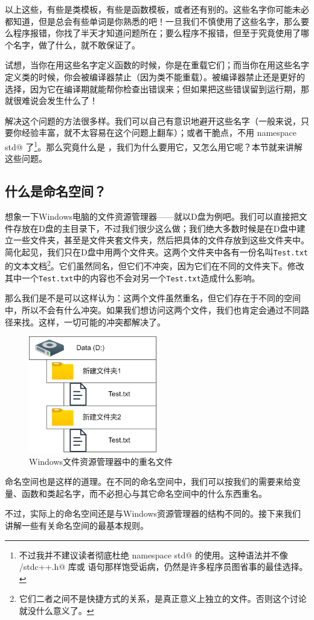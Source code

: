以上这些，有些是类模板，有些是函数模板，或者还有别的。这些名字你可能未必都知道，但是总会有些单词是你熟悉的吧！一旦我们不慎使用了这些名字，那么要么程序报错，你找了半天才知道问题所在；要么程序不报错，但至于究竟使用了哪个名字，做了什么，就不敢保证了。\par
试想，当你在用这些名字定义函数的时候，你是在重载它们；而当你在用这些名字定义类的时候，你会被编译器禁止（因为类不能重载）。被编译器禁止还是更好的选择，因为它在编译期就能帮你检查出错误来；但如果把这些错误留到运行期，那就很难说会发生什么了！\par
解决这个问题的方法很多样。我们可以自己有意识地避开这些名字（一般来说，只要你经验丰富，就不太容易在这个问题上翻车）；或者干脆点，不用 \lstinline@using namespace std@ 了\footnote{不过我并不建议读者彻底杜绝 \lstinline@using namespace std@ 的使用。这种语法并不像 \lstinline@bits/stdc++.h@ 库或 \lstinline@goto@ 语句那样饱受诟病，仍然是许多程序员图省事的最佳选择。}。那么究竟什么是 \lstinline@namespace@，我们为什么要用它，又怎么用它呢？本节就来讲解这些问题。\par
\subsection*{什么是命名空间？}
想象一下Windows电脑的文件资源管理器——就以D盘为例吧。我们可以直接把文件存放在D盘的主目录下，不过我们很少这么做；我们绝大多数时候是在D盘中建立一些文件夹，甚至是文件夹套文件夹，然后把具体的文件存放到这些文件夹中。简化起见，我们只在D盘中用两个文件夹。这两个文件夹中各有一份名叫\texttt{Test.txt}的文本文档\footnote{它们二者之间不是快捷方式的关系，是真正意义上独立的文件。否则这个讨论就没什么意义了。}。它们虽然同名，但它们不冲突，因为它们在不同的文件夹下。修改其中一个\texttt{Test.txt}中的内容也不会对另一个\texttt{Test.txt}造成什么影响。\par
那么我们是不是可以这样认为：这两个文件虽然重名，但它们存在于不同的空间中，所以不会有什么冲突。如果我们想访问这两个文件，我们也肯定会通过不同路径来找。这样，一切可能的冲突都解决了。\par
\begin{figure}[htbp]
    \centering
    \includegraphics[width=0.5\textwidth]{../images/generalized_parts/07_file_explorer_and_namespaces_300.png}
    \caption{Windows文件资源管理器中的重名文件}
\end{figure}
命名空间也是这样的道理。在不同的命名空间中，我们可以按我们的需要来给变量、函数和类起名字，而不必担心与其它命名空间中的什么东西重名。\par
不过，实际上的命名空间还是与Windows资源管理器的结构不同的。接下来我们讲解一些有关命名空间的最基本规则。\par

